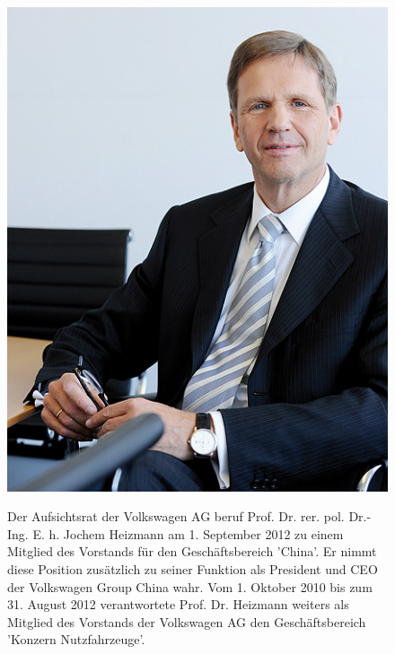 \documentclass[12pt]{article}
\begin{document}
\begin{figure}[here!]
	\centering
	\begin{minipage}[h]{0.20\textwidth}
		\centering
		\includegraphics[width=1.0\textwidth]{images/JochemHeizmann.jpg}
		\label{fig:vorstandvw2}
		\cite{jhpic}
	\end{minipage}
	\begin{minipage}[h]{0.10\textwidth}
		\hspace{1cm} 
	\end{minipage}
	\begin{minipage}[h]{0.65\textwidth}
		Der Aufsichtsrat der Volkswagen AG beruf Prof. Dr. rer. pol. Dr.-Ing. E. h. Jochem Heizmann am 1. September 2012 zu einem Mitglied des Vorstands für den Geschäftsbereich 'China'. Er nimmt diese Position zusätzlich zu seiner Funktion als President und CEO der Volkswagen Group China wahr. Vom 1. Oktober 2010 bis zum 31. August 2012 verantwortete Prof. Dr. Heizmann weiters als Mitglied des Vorstands der Volkswagen AG den Geschäftsbereich 'Konzern Nutzfahrzeuge'.
	\end{minipage}
\end{figure}
\end{document}

